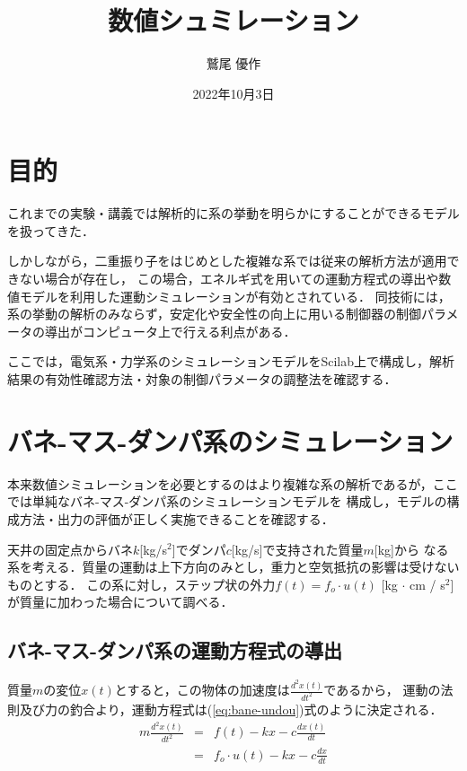 \documentclass[dvipdfmx,titlepage,a4j]{jsarticle}  %
\title{数値シュミレーション}
\author{鷲尾 優作}
\date{2022年10月3日}
\begin{document}
\pagestyle{foot}

\maketitle

\section{目的}
これまでの実験・講義では解析的に系の挙動を明らかにすることができるモデルを扱ってきた．

しかしながら，二重振り子をはじめとした複雑な系では従来の解析方法が適用できない場合が存在し，
この場合，エネルギ式を用いての運動方程式の導出や数値モデルを利用した運動シミュレーションが有効とされている．
同技術には，系の挙動の解析のみならず，安定化や安全性の向上に用いる制御器の制御パラメータの導出がコンピュータ上で行える利点がある．

ここでは，電気系・力学系のシミュレーションモデルをScilab上で構成し，解析結果の有効性確認方法・対象の制御パラメータの調整法を確認する．

\section{バネ-マス-ダンパ系のシミュレーション}
本来数値シミュレーションを必要とするのはより複雑な系の解析であるが，ここでは単純なバネ-マス-ダンパ系のシミュレーションモデルを
構成し，モデルの構成方法・出力の評価が正しく実施できることを確認する．

天井の固定点からバネ$k$[kg/s$^2$]でダンパ$c$[kg/s]で支持された質量$m$[kg]から
なる系を考える．質量の運動は上下方向のみとし，重力と空気抵抗の影響は受けないものとする．
この系に対し，ステップ状の外力$f(t) = f_o \cdot u(t)$ [kg $\cdot$ cm / s$^2$]
が質量に加わった場合について調べる．

\subsection{バネ-マス-ダンパ系の運動方程式の導出}
質量$m$の変位$x(t)$とすると，この物体の加速度は$\frac{d^2x(t)}{dt^2}$であるから，
運動の法則及び力の釣合より，運動方程式は(\ref{eq:bane-undou})式のように決定される．
\begin{eqnarray}
  m \frac{d^2x(t)}{dt^2} &=& f(t) - kx - c \frac{dx(t)}{dt} \nonumber \\
  &=& f_o \cdot u(t) - kx - c \frac{dx}{dt} \label{eq:bane-undou}
\end{eqnarray}
\end{document}
